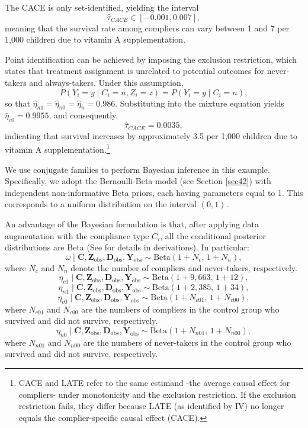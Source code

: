 The CACE is only set-identified, yielding the interval
\[
\hat{\tau}_{CACE} \in [-0.001, 0.007],
\]
meaning that the survival rate among compliers can vary between 1 and 7 per 1,000 children due to vitamin A supplementation.

Point identification can be achieved by imposing the exclusion restriction, which states that treatment assignment is unrelated to potential outcomes for never-takers and always-takers. Under this assumption,
\[
P(Y_i = y \mid C_i = n, Z_i = z) = P(Y_i = y \mid C_i = n),
\]
so that $\hat{\eta}_{n1} = \hat{\eta}_{n0} = \hat{\eta}_n = 0.986$. Substituting into the mixture equation yields $\hat{\eta}_{c0} = 0.9955$, and consequently,
\[
\hat{\tau}_{CACE} = 0.0035,
\]
indicating that survival increases by approximately 3.5 per 1,000 children due to vitamin A supplementation.\footnote{CACE and LATE refer to the same estimand -the average causal effect for compliers- under monotonicity and the exclusion restriction. If the exclusion restriction fails, they differ because LATE (as identified by IV) no longer equals the complier-specific causal effect (CACE).}
 
We use conjugate families to perform Bayesian inference in this example. Specifically, we adopt the Bernoulli-Beta model (see Section \ref{sec42}) with independent non-informative Beta priors, each having parameters equal to 1. This corresponds to a uniform distribution on the interval $(0,1)$.  

An advantage of the Bayesian formulation is that, after applying data augmentation with the compliance type $C_i$, all the conditional posterior distributions are Beta (See \cite{imbens1997bayesian} for details in derivations). In particular:
\[
\omega \mid \mathbf{C}, \mathbf{Z}_{\text{obs}}, \mathbf{D}_{\text{obs}}, \mathbf{Y}_{\text{obs}} \sim \text{Beta}(1 + N_c,\, 1 + N_n),
\]
where $N_c$ and $N_n$ denote the number of compliers and never-takers, respectively.
\[
\eta_{c1} \mid \mathbf{C}, \mathbf{Z}_{\text{obs}}, \mathbf{D}_{\text{obs}}, \mathbf{Y}_{\text{obs}} \sim \text{Beta}(1 + 9{,}663,\, 1 + 12),
\]
\[
\eta_{n1} \mid \mathbf{C}, \mathbf{Z}_{\text{obs}}, \mathbf{D}_{\text{obs}}, \mathbf{Y}_{\text{obs}} \sim \text{Beta}(1 + 2{,}385,\, 1 + 34),
\]
\[
\eta_{c0} \mid \mathbf{C}, \mathbf{Z}_{\text{obs}}, \mathbf{D}_{\text{obs}}, \mathbf{Y}_{\text{obs}} \sim \text{Beta}(1 + N_{c01},\, 1 + N_{c00}),
\]
where $N_{c01}$ and $N_{c00}$ are the numbers of compliers in the control group who survived and did not survive, respectively.
\[
\eta_{n0} \mid \mathbf{C}, \mathbf{Z}_{\text{obs}}, \mathbf{D}_{\text{obs}}, \mathbf{Y}_{\text{obs}} \sim \text{Beta}(1 + N_{n01},\, 1 + N_{n00}),
\]
where $N_{n01}$ and $N_{n00}$ are the numbers of never-takers in the control group who survived and did not survive, respectively.


